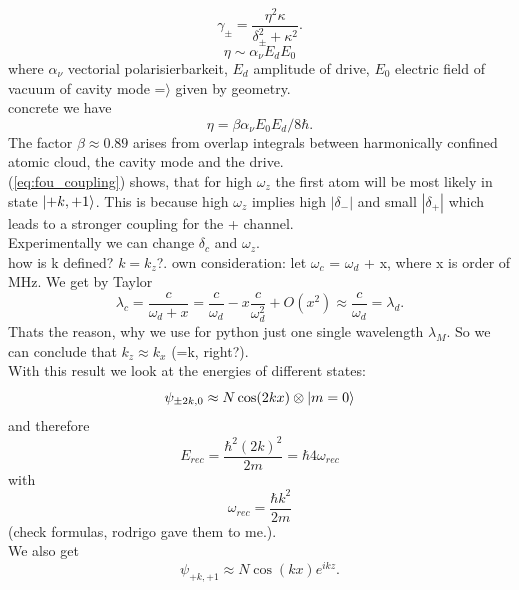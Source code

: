 \\
\begin{equation}\label{eq:fou_decay}
	\gamma_\pm = \frac{\eta^2 \kappa}{\delta_\pm^2 + \kappa^2}.
\end{equation}
\begin{equation}
	\eta \sim \alpha_\nu E_d E_0
\end{equation}
where $\alpha_\nu$ vectorial polarisierbarkeit, $E_d$ amplitude of drive, $E_0$ electric field of vacuum of cavity mode =$\rangle$ given by geometry.
\\
concrete we have
\begin{equation}
	\eta = \beta \alpha_\nu E_0 E_d / 8 \hbar.
\end{equation}
The factor $\beta \approx 0.89$ arises from overlap integrals between harmonically confined atomic cloud, the cavity mode and the drive.
\\
 (\ref{eq:fou_coupling}) shows, that for high $\omega_z$ the first atom will be most likely in state $\ket{+k,+1}$. This is because high $\omega_z$ implies high $| \delta_- |$ and small $| \delta_+ |$ which leads to a stronger coupling for the + channel. 
\\
Experimentally we can change $\delta_c$ and $\omega_z$.  
\\ 
 how is k defined? $k=k_z$?. own consideration: let $\omega_c$ = $\omega_d$ + x, where x is order of MHz. We get by Taylor
 \begin{equation}
 	\lambda_c = \frac{c}{\omega_d + x} = \frac{c}{\omega_d}- x \frac{c}{\omega_d^2} + O(x^2) \approx \frac{c}{\omega_d} = \lambda_d.
 \end{equation}
Thats the reason, why we use for python just one single wavelength $\lambda_M$. So we can conclude that $k_z \approx k_x$ (=k, right?). 
 \\
 With this result we look at the energies of different states: 
 \begin{equation}
 	\psi_{\pm 2 k, 0} \approx N \cos(2kx) \otimes \ket{m=0}
 \end{equation}
 and therefore
 \begin{equation}
 	E_{rec} = \frac{\hbar^2 (2k)^2}{2m} = \hbar 4 \omega_{rec}
 \end{equation}
 with 
 \begin{equation}
 	\omega_{rec} =  \frac{\hbar k^2}{2m}
 \end{equation}
 (check formulas, rodrigo gave them to me.).
 \\
 We also get
 \begin{equation}
 	\psi_{+k,+1} \approx N \cos(kx)e^{ikz}.
 \end{equation}
